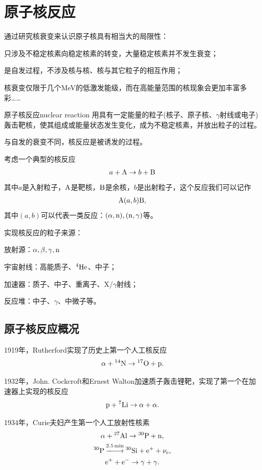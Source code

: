 \chapter{原子核反应}
通过研究核衰变来认识原子核具有相当大的局限性：
\begin{compactitem}
	\item 只涉及不稳定核素向稳定核素的转变，大量稳定核素并不发生衰变；
	\item 是自发过程，不涉及核与核、核与其它粒子的相互作用；
	\item 核衰变仅限于几个MeV的低激发能级，而在高能量范围的核现象会更加丰富多彩……
\end{compactitem} 

\begin{definition}{原子核反应}{nuclear reaction}
	用具有一定能量的粒子(核子、原子核、$\gamma$射线或电子)轰击靶核，使其组成或能量状态发生变化，成为不稳定核素，并放出粒子的过程。
\end{definition}
与自发的衰变不同，核反应是被诱发的过程。

考虑一个典型的核反应
\begin{align}\label{AabB}
	a+\mathrm{A}\to b+\mathrm{B}
\end{align}
其中$a$是入射粒子，$\mathrm{A}$是靶核，$\mathrm{B}$是余核，$b$是出射粒子，这个反应我们可以记作
\[
	{\mathrm{A}}(a,b){\mathrm{B}},
\]
其中$(a,b)$可以代表一类反应：$(\alpha,\mathrm n),(\mathrm n,\gamma)$等。

实现核反应的粒子来源：
\begin{compactitem}
	\item 放射源：$\alpha,\beta,\gamma,\mathrm n$
	\item 宇宙射线：高能质子、${^{4}\mathrm{He}}$、中子；
	\item 加速器：质子、中子、重离子、X/$\gamma$射线；
	\item 反应堆：中子、$\gamma$、中微子等。
\end{compactitem}
\section{原子核反应概况}
1919年，Rutherford实现了历史上第一个人工核反应
\[
	\alpha+{^{14}\mathrm{N}}\to{^{17}\mathrm{O}}+\mathrm p.
\]

1932年，John. Cockcroft和Ernest Walton加速质子轰击锂靶，实现了第一个在加速器上实现的核反应
\[
	\mathrm p+{^{7}\mathrm{Li}}\to\alpha+\alpha.
\]

1934年，Curie夫妇产生第一个人工放射性核素
\begin{gather*}
	\alpha+{^{27}\mathrm{Al}}\to{^{30}\mathrm{P}}+\mathrm n,\\
	{^{30}\mathrm{P}}\overset{\SI{2.5}{min}}{-\hspace{-4pt}-\hspace{-5pt}\longrightarrow}{^{30}\mathrm{Si}}+\mathrm e^++\nu_\mathrm e,\\
	\mathrm e^++\mathrm e^-\to\gamma+\gamma.
\end{gather*}

